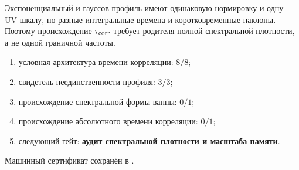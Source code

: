 \begin{nogocriterion}
Экспоненциальный и гауссов профиль имеют одинаковую нормировку и одну
UV-шкалу, но разные интегральные времена и коротковременные наклоны.
Поэтому происхождение $\tau_{\rm corr}$ требует родителя полной спектральной
плотности, а не одной граничной частоты.
\end{nogocriterion}

\begin{protocol}\begin{enumerate}
\item условная архитектура времени корреляции: \textbf{$8/8$};
\item свидетель неединственности профиля: \textbf{$3/3$};
\item происхождение спектральной формы ванны: \textbf{$0/1$};
\item происхождение абсолютного времени корреляции: \textbf{$0/1$};
\item следующий гейт: \textbf{аудит спектральной плотности и масштаба памяти}.
\end{enumerate}\end{protocol}

Машинный сертификат сохранён в
.
